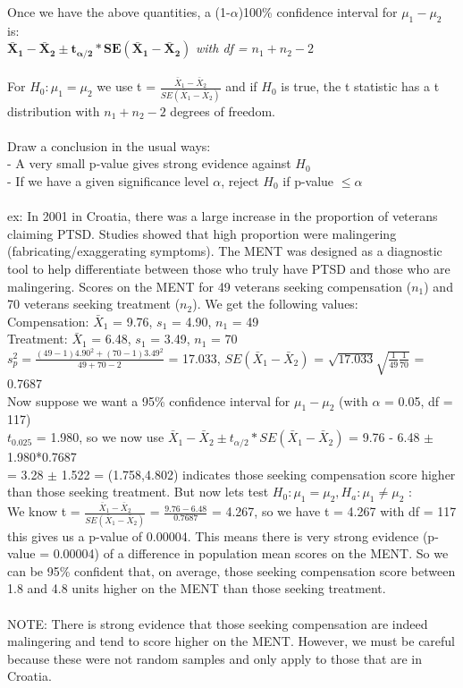 \documentclass[12pt, a4paper]{article}
\begin{document}
	Once we have the above quantities, a (1-$\alpha$)100\% confidence interval for $\mu_1 - \mu_2$ is: \\
	$\bm{\bar{X}_1 - \bar{X}_2 \pm t_{\alpha/2} * SE(\bar{X}_1 - \bar{X}_2)}$ \textit{with df = $n_1 + n_2 - 2$} \\~\\
	For $H_0: \mu_1 = \mu_2$ we use t = $\frac{\bar{X}_1 - \bar{X}_2}{SE(\bar{X}_1 - \bar{X}_2)}$ and if $H_0$ is true, the t statistic has a t distribution with $n_1 + n_2 - 2$ degrees of freedom. \\~\\
	Draw a conclusion in the usual ways: \\
	- A very small p-value gives strong evidence against $H_0$ \\
	- If we have a given significance level $\alpha$, reject $H_0$ if p-value $\leq \alpha$ \\~\\
	ex: In 2001 in Croatia, there was a large increase in the proportion of veterans claiming PTSD. Studies showed that high proportion were malingering (fabricating/exaggerating symptoms). The MENT was designed as a diagnostic tool to help differentiate between those who truly have PTSD and those who are malingering. Scores on the MENT for 49 veterans seeking compensation ($n_1$) and 70 veterans seeking treatment ($n_2$). We get the following values: \\
	Compensation: $\bar{X}_1$ = 9.76, $s_1$ = 4.90, $n_1$ = 49 \\
	Treatment: $\bar{X}_1$ = 6.48, $s_1$ = 3.49, $n_1$ = 70 \\
	$s^2_p = \frac{(49-1)4.90^2 + (70-1)3.49^2}{49+70-2}$ = 17.033, $SE(\bar{X}_1 - \bar{X}_2)$ = $\sqrt{17.033}\sqrt{\frac{1}{49}\frac{1}{70}}$ = 0.7687 \\
	Now suppose we want a 95\% confidence interval for $\mu_1 - \mu_2$ (with $\alpha$ = 0.05, df = 117)\\
	$t_{0.025}$ = 1.980, so we now use $\bar{X}_1 - \bar{X}_2 \pm t_{\alpha/2} * SE(\bar{X}_1 - \bar{X}_2)$ = 9.76 - 6.48 $\pm$ 1.980*0.7687 \\ = 3.28 $\pm$ 1.522 = (1.758,4.802) indicates those seeking compensation score higher than those seeking treatment. But now lets test $H_0: \mu_1 = \mu_2, H_a: \mu_1 \neq \mu_2$ : \\
	We know t = $\frac{\bar{X}_1 - \bar{X}_2}{SE(\bar{X}_1 - \bar{X}_2)}$ = $\frac{9.76-6.48}{0.7687}$ = 4.267, so we have t = 4.267 with df = 117 \\ this gives us a p-value of 0.00004. This means there is very strong evidence (p-value = 0.00004) of a difference in population mean scores on the MENT. So we can be 95\% confident that, on average, those seeking compensation score between 1.8 and 4.8 units higher on the MENT than those seeking treatment. \\~\\
	NOTE: There is strong evidence that those seeking compensation are indeed malingering and tend to score higher on the MENT. However, we must be careful because these were not random samples and only apply to those that are in Croatia. \newpage
	
\end{document}
